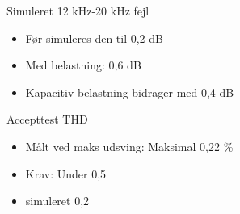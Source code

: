 \documentclass{beamer}
\begin{document}
\begin{frame}{Simuleret 12 kHz-20 kHz fejl}
\begin{itemize}
\item Før simuleres den til 0,2 dB
\item Med belastning: 0,6 dB
\item Kapacitiv belastning bidrager med 0,4 dB
\end{itemize}
\end{frame}

\begin{frame}{Accepttest THD}
\begin{itemize}
\item Målt ved maks udsving: Maksimal 0,22 \%
\item Krav: Under 0,5
\item simuleret 0,2
\end{itemize}
\end{frame}
\end{document}

